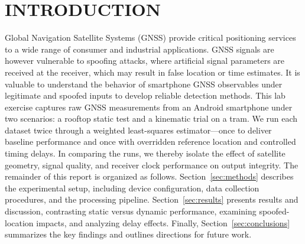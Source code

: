 
\section{INTRODUCTION} \label{sec:introduction}


    Global Navigation Satellite Systems (GNSS) provide critical positioning services to a wide range of consumer and industrial applications. GNSS signals are however vulnerable to spoofing attacks, where artificial signal parameters are received at the receiver, which may result in false location or time estimates. It is valuable to understand the behavior of smartphone GNSS observables under legitimate and spoofed inputs to develop reliable detection methods. This lab exercise captures raw GNSS measurements from an Android smartphone under two scenarios: a rooftop static test and a kinematic trial on a tram. 
    We run each dataset twice through a weighted least-squares estimator—once to deliver baseline performance and once with overridden reference location and controlled timing delays. In comparing the runs, we thereby isolate the effect of satellite geometry, signal quality, and receiver clock performance on output integrity.
    The remainder of this report is organized as follows. Section~\ref{sec:methods} describes the experimental setup, including device configuration, data collection procedures, and the processing pipeline. 
    Section~\ref{sec:results} presents results and discussion, contrasting static versus dynamic performance, examining spoofed-location impacts, and analyzing delay effects. 
    Finally, Section~\ref{sec:conclusions} summarizes the key findings and outlines directions for future work.
